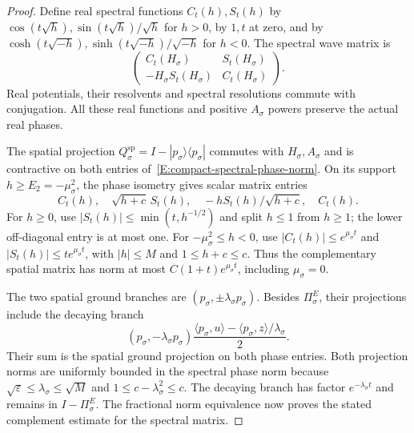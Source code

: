 \begin{proof}
  Define real spectral functions $C_t(h),S_t(h)$ by
  $\cos(t\sqrt h),\sin(t\sqrt h)/\sqrt h$ for $h>0$,
  by $1,t$ at zero, and by
  $\cosh(t\sqrt{-h}),\sinh(t\sqrt{-h})/\sqrt{-h}$ for $h<0$.
  The spectral wave matrix is
  \begin{equation}\label{E:compact-spectral-wave}
    \begin{pmatrix}
      C_t(H_\sigma)&S_t(H_\sigma)\\
      -H_\sigma S_t(H_\sigma)&C_t(H_\sigma)
    \end{pmatrix}.
  \end{equation}
  Real potentials, their resolvents and spectral resolutions commute
  with conjugation. All these real functions and positive $A_\sigma$
  powers preserve the actual real phases.

  The spatial projection
  $Q_\sigma^{\mathrm{sp}}=I-|p_\sigma\rangle\langle p_\sigma|$
  commutes with $H_\sigma,A_\sigma$ and is contractive on both
  entries of~\eqref{E:compact-spectral-phase-norm}.
  On its support $h\ge E_2=-\mu_\sigma^2$, the phase isometry gives
  scalar matrix entries
  \[
    C_t(h),\quad \sqrt{h+c}\,S_t(h),\quad
    -hS_t(h)/\sqrt{h+c},\quad C_t(h).
  \]
  For $h\ge0$, use $|S_t(h)|\le\min(t,h^{-1/2})$ and split
  $h\le1$ from $h\ge1$; the lower off-diagonal entry is at most
  one. For $-\mu_\sigma^2\le h<0$, use
  $|C_t(h)|\le e^{\mu_\sigma t}$ and
  $|S_t(h)|\le t e^{\mu_\sigma t}$, with
  $|h|\le M$ and $1\le h+c\le c$.
  Thus the complementary spatial matrix has norm at most
  $C(1+t)e^{\mu_\sigma t}$, including $\mu_\sigma=0$.

  The two spatial ground branches are
  $(p_\sigma,\pm\lambda_\sigma p_\sigma)$. Besides $\Pi_\sigma^E$,
  their projections include the decaying branch
  \[
    (p_\sigma,-\lambda_\sigma p_\sigma)
    \frac{\langle p_\sigma,u\rangle
    -\langle p_\sigma,z\rangle/\lambda_\sigma}{2}.
  \]
  Their sum is the spatial ground projection on both phase entries.
  Both projection norms are uniformly bounded in the spectral phase
  norm because $\sqrt\varepsilon\le\lambda_\sigma\le\sqrt M$
  and $1\le c-\lambda_\sigma^2\le c$. The decaying branch has
  factor $e^{-\lambda_\sigma t}$ and remains in $I-\Pi_\sigma^E$.
  The fractional norm equivalence now proves the stated complement
  estimate for the spectral matrix.


\end{proof}
